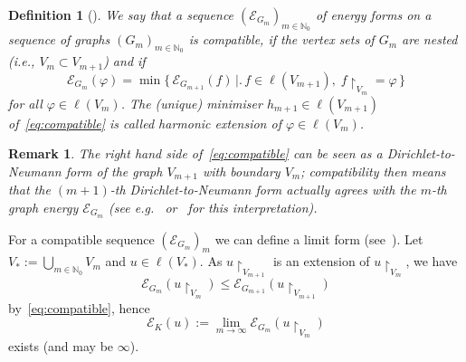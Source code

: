 \documentclass[12pt,reqno,a4paper]{amsart}            %
\numberwithin{equation}{section}
\theoremstyle{mythmstyle}       %
\theoremstyle{mydefstyle}        %
\newtheorem{definition}[theorem]{Definition}
\newtheorem*{remark*}{Remark}
\newcommand{\bigset}[2]{\bigl\{ \, #1 \, \bigl|\bigr. \, #2 \, \bigr\} }
\newcommand{\restr}[1]{{\restriction}_{#1}} %
\renewcommand{\phi}{\varphi}   %
\newcommand{\N}{\mathbb{N}} %
\newcommand{\1}{\mathbbm 1}                    %
\newcommand{\lsymb}    {\ell}          %
\newcommand{\energy}{\mathcal E}
\newcommand{\lspace}[1]{\lsymb({#1})}   %
\begin{document}
\begin{definition}[{\cite[Def.~2.2.1]{kigami:01}}]
  \label{def:compatible}
  We say that a sequence $(\energy_{G_m})_{m \in \N_0}$ of energy forms on
  a sequence of graphs $(G_m)_{m \in \N_0}$ is \emph{compatible}, if
  the vertex sets of $G_m$ are nested (i.e., $V_m \subset V_{m+1}$)
  and if
  \begin{equation}
    \label{eq:compatible}
    \energy_{G_m}(\phi)=
    \min\bigset{\energy_{G_{m+1}}(f)}
    {f \in \lspace{V_{m+1}}, \; f \restr {V_m}=\phi}
  \end{equation}
  for all $\phi \in \lspace{V_m}$.  The (unique) minimiser $h_{m+1}
  \in \lspace{V_{m+1}}$ of~\eqref{eq:compatible} is called
  \emph{harmonic extension} of $\phi \in \lspace{V_m}$.
\end{definition}
\begin{remark*}
  The right hand side of~\eqref{eq:compatible} can be seen as a
  Dirichlet-to-Neumann form of the graph $V_{m+1}$ with boundary
  $V_m$; compatibility then means that the $(m+1)$-th
  Dirichlet-to-Neumann form actually agrees with the $m$-th graph
  energy $\energy_{G_m}$ (see e.g.~\cite[Sec.~2.1]{kigami:01}
  or~\cite[Sec.~6.7]{post:16} for this interpretation).
\end{remark*}
For a compatible sequence $(\energy_{G_m})_m$ we can define a limit
form (see~\cite[Sec.~2.2]{kigami:01}).  Let $V_*:=\bigcup_{m \in \N_0}
V_m$ and $u \in \lspace{V_*}$.  As $u \restr{V_{m+1}}$ is an extension
of $u \restr {V_m}$, we have
\begin{equation*}
  \energy_{G_m}(u \restr {V_m})
  \le \energy_{G_{m+1}}(u \restr {V_{m+1}})
\end{equation*}
by~\eqref{eq:compatible}, hence
\begin{equation}
  \label{eq:limit.form}
  \energy_K(u) := \lim_{m \to \infty} \energy_{G_m}(u \restr {V_m})
\end{equation}
exists (and may be $\infty$).
\end{document}
